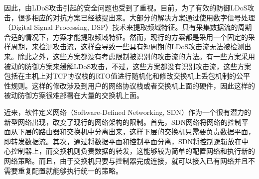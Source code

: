 因此，由LDoS攻击引起的安全问题也受到了重视。目前，为了有效的防御LDoS攻击，很多相应的对抗方案已经被提出来。大部分的解决方案\cite{b1,b4, b6, b7, b22}通过使用数字信号处理（Digital Signal Processing, DSP）技术来提取频域特征。只有采集数据流的周期合适的情况下，方案才能提取频域特征。然而，现行的方案都是采用一个固定的采样周期，来检测攻击流，这样会导致一些具有短周期的LDoS攻击流无法被检测出来。除此之外，这些方案都没有考虑限制被识别的攻击流的方法。有一些方案采用被动的防御方案来缓解LDoS攻击，不过，这些方案都没有识别攻击流，这些方案包括在主机上对TCP协议栈的RTO值进行随机化\cite{b17}和修改交换机上丢包机制的公平性规则\cite{b8}。这样的修改涉及到用户的网络协议栈或者交换机上面的硬件，因此这样的被动防御方案很难部署在大量的交换机上面。

近来，软件定义网络（Software-Defined Networking, SDN）作为一个很有潜力的新型网络出现，改变了现行的网络架构的限制。首先，SDN网络将网络的控制平面从下层的路由器和交换机中分离出来，这样下层的交换机只需要负责数据平面，即转发数据流。其次，通过将数据平面和控制平面分离，SDN将控制逻辑放在中心控制器上，而交换机则负责数据的转发，这能够较为简单的配置网络和执行新的网络策略。而且，由于交换机只要与控制器完成连接，就可以接入已有网络并且不需要重复配置就能够执行统一的策略。



